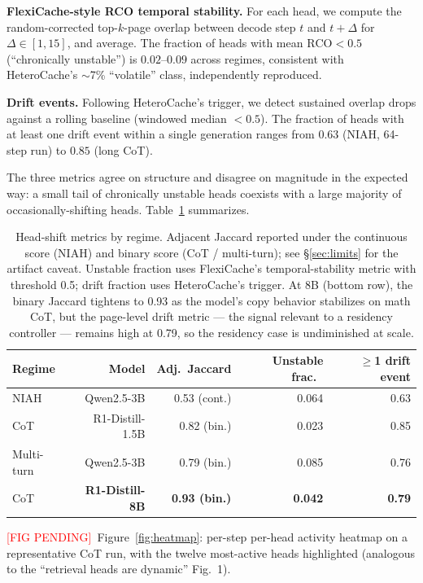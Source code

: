 \documentclass[11pt]{article}
\newcommand{\NEEDFIG}{\textcolor{red}{[FIG PENDING]}}
\begin{document}
\textbf{FlexiCache-style RCO temporal stability.} For each head, we
compute the random-corrected top-$k$-page overlap between decode step
$t$ and $t + \Delta$ for $\Delta \in [1, 15]$, and average. The fraction
of heads with mean $\mathrm{RCO} < 0.5$ (``chronically unstable'') is
$0.02$--$0.09$ across regimes, consistent with HeteroCache's $\sim$7\%
``volatile'' class, independently reproduced.

\textbf{Drift events.} Following HeteroCache's trigger, we detect
sustained overlap drops against a rolling baseline (windowed median
$< 0.5$). The fraction of heads with at least one drift event within a
single generation ranges from $0.63$ (NIAH, 64-step run) to
$0.85$ (long CoT).

The three metrics agree on structure and disagree on magnitude in the
expected way: a small tail of chronically unstable heads coexists with
a large majority of occasionally-shifting heads. Table~\ref{tab:churn}
summarizes.

\begin{table}[t]
\centering
\small
\begin{tabular}{lrrrr}
\toprule
Regime & Model & Adj.~Jaccard & Unstable frac.\ & $\geq$1 drift event \\
\midrule
NIAH & Qwen2.5-3B & 0.53 (cont.) & 0.064 & 0.63 \\
CoT & R1-Distill-1.5B & 0.82 (bin.) & 0.023 & 0.85 \\
Multi-turn & Qwen2.5-3B & 0.79 (bin.) & 0.085 & 0.76 \\
\midrule
CoT & \textbf{R1-Distill-8B} & \textbf{0.93 (bin.)} & \textbf{0.042} & \textbf{0.79} \\
\bottomrule
\end{tabular}
\caption{Head-shift metrics by regime. Adjacent Jaccard reported under
the continuous score (NIAH) and binary score (CoT / multi-turn); see
\S\ref{sec:limits} for the artifact caveat. Unstable fraction uses
FlexiCache's temporal-stability metric with threshold 0.5; drift
fraction uses HeteroCache's trigger. At 8B (bottom row), the binary
Jaccard tightens to 0.93 as the model's copy behavior stabilizes on
math CoT, but the page-level drift metric --- the signal relevant to
a residency controller --- remains high at 0.79, so the residency
case is undiminished at scale.}
\label{tab:churn}
\end{table}

\NEEDFIG~Figure~\ref{fig:heatmap}: per-step per-head activity heatmap
on a representative CoT run, with the twelve most-active heads
highlighted (analogous to the ``retrieval heads are dynamic'' Fig.~1).
\end{document}
